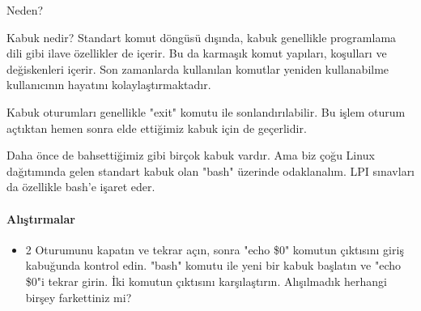 \begin{section}{Neden?}
\begin{subsection}{Kabuk nedir?}
Standart komut döngüsü dışında, kabuk genellikle programlama dili gibi ilave özellikler de içerir. Bu da karmaşık komut yapıları, koşulları ve değiskenleri içerir. Son zamanlarda kullanılan komutlar yeniden kullanabilme kullanıcının hayatını kolaylaştırmaktadır.

Kabuk oturumları genellikle "exit" komutu ile sonlandırılabilir. Bu işlem oturum açtıktan hemen sonra elde ettiğimiz kabuk için de geçerlidir.

Daha önce de bahsettiğimiz gibi birçok kabuk vardır. Ama biz çoğu Linux dağıtımında gelen standart kabuk olan "bash" üzerinde odaklanalım. LPI sınavları da özellikle bash'e işaret eder.
\paragraph{Alıştırmalar}{
\begin{itemize}
 \item 2 Oturumunu kapatın ve tekrar açın, sonra "echo \$0" komutun çıktısını giriş kabuğunda kontrol edin. "bash" komutu ile yeni bir kabuk başlatın ve "echo \$0"i tekrar girin. İki komutun çıktısını karşılaştırın. Alışılmadık herhangi birşey farkettiniz mi?
\end{itemize}}
\end{subsection}
\end{section}
